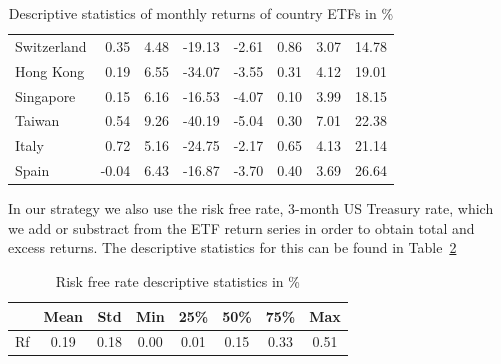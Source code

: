 \documentclass[a4paper,12pt,twoside]{article}
\begin{document}
\begin{table}[ht]
\begin{tabular}{lrrrrrrr}
Switzerland  & 0.35          & 4.48         & -19.13       & -2.61         & 0.86          & 3.07          & 14.78       \\
Hong Kong    & 0.19          & 6.55         & -34.07       & -3.55         & 0.31          & 4.12          & 19.01       \\
Singapore    & 0.15          & 6.16         & -16.53       & -4.07         & 0.10          & 3.99          & 18.15       \\
Taiwan       & 0.54          & 9.26         & -40.19       & -5.04         & 0.30          & 7.01          & 22.38       \\
Italy        & 0.72          & 5.16         & -24.75       & -2.17         & 0.65          & 4.13          & 21.14       \\
Spain        & -0.04         & 6.43         & -16.87       & -3.70         & 0.40          & 3.69          & 26.64       \\
\bottomrule
\end{tabular}
\caption{Descriptive statistics of monthly returns of country ETFs in \%}
\label{tab:summary_stats_return}
\end{table}


In our strategy we also use the risk free rate, 3-month US Treasury rate, which we add or substract from the ETF return series in order to obtain total and excess returns. The descriptive statistics for this can be found in Table~\ref{tab:summary_stats_rf}


\begin{table}[ht]
\centering
\begin{tabular}{lccccccc}
\toprule
    & \textbf{Mean} & \textbf{Std} & \textbf{Min} & \textbf{25\%} & \textbf{50\%} & \textbf{75\%} & \textbf{Max} \\
\midrule
  Rf & 0.19 & 0.18 & 0.00 & 0.01 & 0.15 & 0.33 & 0.51 \\
\bottomrule
\end{tabular}
\caption{Risk free rate descriptive statistics in \% }
\label{tab:summary_stats_rf}
\end{table}


\newpage
\end{document}

